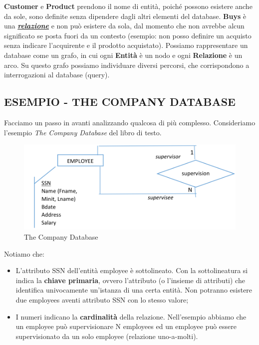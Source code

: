 \textbf{Customer} e	\textbf{Product} prendono	il	nome	di	entità,	poiché	possono	esistere	anche	da	sole,	sono	definite	senza	dipendere	dagli	altri	elementi	del	database. \textbf{Buys} è	una	\underline{\textit{\textbf{relazione}}}	e	non	può	esistere	da	sola,	dal	momento	che	non	avrebbe	alcun	significato	se	posta	fuori	da	un	contesto	(esempio:	non	posso	definire	un	acquisto	senza	indicare	l’acquirente	e	il	prodotto	acquistato).	Possiamo	rappresentare	un	database	come	un	grafo,	in	cui	ogni	\textbf{Entità}	è	un	nodo	e	ogni	\textbf{Relazione}	è	un	arco.	Su	questo	grafo	possiamo	individuare	diversi	percorsi,	che	corrispondono	a	interrogazioni	al	database	(query).

\subsection{ESEMPIO - THE COMPANY DATABASE}

Facciamo	un	passo	in	avanti	analizzando	qualcosa	di	più	complesso.	Consideriamo	l’esempio	\textit{The	Company	Database} del	libro	di	testo.	

\begin{center}
\begin{figure}[H]
\centering
\includegraphics[scale=1]{figures/tcd.png}
\caption{The Company Database} 
\end{figure}
\end{center}

Notiamo	che:

\begin{itemize}

\item L’attributo	SSN	dell’entità	employee	è	sottolineato.	Con	la	sottolineatura	si	indica	la	\textbf{chiave	primaria},	ovvero	l’attributo	(o	l’insieme	di	attributi)	che	identifica	univocamente	un’istanza	di	una	certa	entità.	Non	potranno	esistere	due	employees	aventi	attributo	SSN	con	lo	stesso	valore;
\item I	numeri	indicano	la	\textbf{cardinalità}	della	relazione.	Nell’esempio	abbiamo	che	un	employee	può	supervisionare	N	employees	ed	un	employee	può	essere	supervisionato	da	un	solo	employee	(relazione	uno-a-molti).

\end{itemize}

